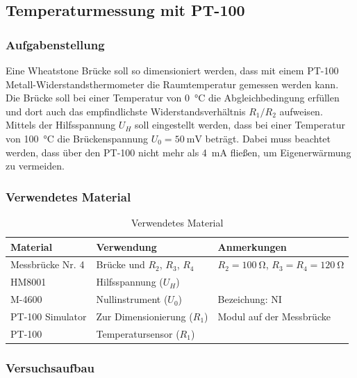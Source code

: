 \newpage
\subsection{Temperaturmessung mit PT-100}\label{sec:1-5}
\subsubsection{Aufgabenstellung}

Eine Wheatstone Brücke soll so dimensioniert werden, dass mit einem PT-100
Metall-Widerstandsthermometer die Raumtemperatur gemessen werden kann.
Die Brücke soll bei einer Temperatur von \SI{0}{\degreeCelsius} die
Abgleichbedingung erfüllen und dort auch das empfindlichste
Widerstandsverhältnis $R_1/R_2$ aufweisen. Mittels der Hilfsspannung $U_H$ soll
eingestellt werden, dass bei einer Temperatur von \SI{100}{\degreeCelsius} die
Brückenspannung $U_0=\SI{50}{\milli\volt}$ beträgt. Dabei muss beachtet werden,
dass über den PT-100 nicht mehr als \SI{4}{\milli\ampere} fließen, um
Eigenerwärmung zu vermeiden.

\subsubsection{Verwendetes Material}

\begin{table}[h]
	\centering
	\caption{Verwendetes Material}
	\begin{tabularx}{\textwidth}{XXX}
		\textbf{Material} & \textbf{Verwendung}            & \textbf{Anmerkungen}                           \\ \midrule
		Messbrücke Nr. 4  & Brücke und $R_2$, $R_3$, $R_4$ & $R_2=\SI{100}{\ohm}$, $R_3=R_4=\SI{120}{\ohm}$ \\
		HM8001            & Hilfsspannung ($U_H$)          &                                                \\
		M-4600            & Nullinstrument ($U_0$)         & Bezeichung: NI                                 \\
		PT-100 Simulator  & Zur Dimensionierung ($R_1$)    & Modul auf der Messbrücke                       \\
		PT-100            & Temperatursensor ($R_1$)       &                                                \\
	\end{tabularx}
\end{table}

\subsubsection{Versuchsaufbau}

